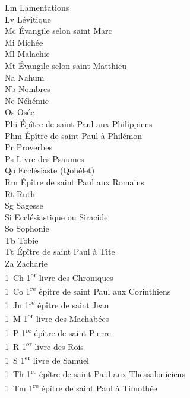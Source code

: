\documentclass [11pt]{article}
\begin{document}
		\noindent Lm \tabto{5em} Lamentations\\
		Lv \tabto{5em} Lévitique\\
		Mc \tabto{5em} Évangile selon saint Marc\\
		Mi \tabto{5em} Michée\\
		Ml \tabto{5em} Malachie\\
		Mt \tabto{5em} Évangile selon saint Matthieu\\
		Na \tabto{5em} Nahum\\
		Nb \tabto{5em} Nombres\\
		Ne \tabto{5em} Néhémie\\
		Os \tabto{5em} Osée\\
		Phi \tabto{5em} Épître de saint Paul aux Philippiens\\
		Phm \tabto{5em} Épître de saint Paul à Philémon\\
		Pr \tabto{5em} Proverbes\\
		Ps \tabto{5em} Livre des Psaumes\\
		Qo \tabto{5em} Ecclésiaste (Qohélet)\\
		Rm \tabto{5em} Épître de saint Paul aux Romains\\
		Rt \tabto{5em} Ruth\\
		Sg \tabto{5em} Sagesse\\
		Si \tabto{5em} Ecclésiastique ou Siracide\\
		So \tabto{5em} Sophonie\\
		Tb \tabto{5em} Tobie\\
		Tt \tabto{5em} Épître de saint Paul à Tite\\
		Za \tabto{5em} Zacharie\\
		1~Ch \tabto{5em} 1\textsuperscript{er} livre des Chroniques\\
		1~Co \tabto{5em} 1\textsuperscript{re} épître de saint Paul aux Corinthiens\\
		1~Jn \tabto{5em} 1\textsuperscript{re} épître de saint Jean\\
		1~M \tabto{5em} 1\textsuperscript{er} livre des Machabées\\
		1~P \tabto{5em} 1\textsuperscript{re} épître de saint Pierre\\
		1~R \tabto{5em} 1\textsuperscript{er} livre des Rois\\
		1~S \tabto{5em} 1\textsuperscript{er} livre de Samuel\\
		1~Th \tabto{5em} 1\textsuperscript{re} épître de saint Paul aux Thessaloniciens\\
		1~Tm \tabto{5em} 1\textsuperscript{re} épître de saint Paul à Timothée\\
\end{document}
